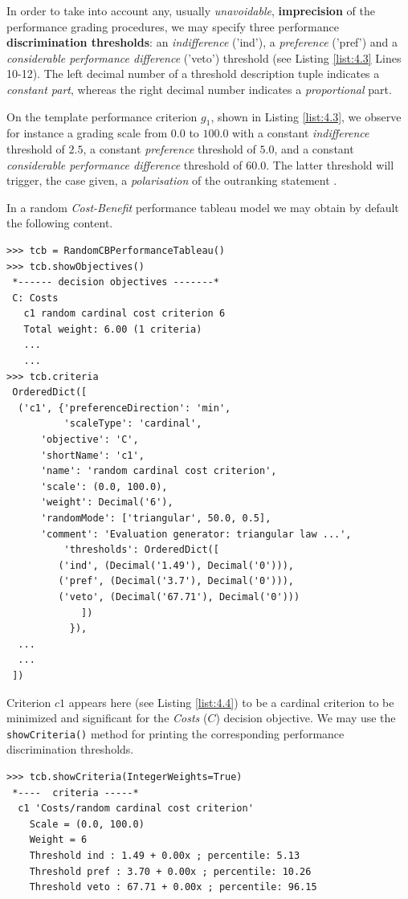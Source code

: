 In order to take into account any, usually \emph{unavoidable}, \textbf{imprecision} of the performance grading procedures, we may specify three performance \textbf{discrimination thresholds}: an \emph{indifference} ('ind'), a \emph{preference} ('pref') and a \emph{considerable performance difference} ('veto') threshold (see Listing \ref{list:4.3} Lines 10-12). The left decimal number of a threshold description tuple indicates a \emph{constant part}, whereas the right decimal number indicates a \emph{proportional} part.

On the template performance criterion $g_1$, shown in Listing \ref{list:4.3}, we observe for instance a grading scale from $0.0$ to $100.0$ with a constant \emph{indifference} threshold of $2.5$, a constant \emph{preference} threshold of $5.0$, and a constant \emph{considerable performance difference} threshold of $60.0$. The latter threshold  will trigger, the case given, a \emph{polarisation} of the outranking statement \citep{BIS-2013}.

In a random \emph{Cost-Benefit} performance tableau model we may obtain by default the following content.

\begin{lstlisting}[caption={Example of cardinal Costs criterion},label=list:4.4,basicstyle=\footnotesize]
>>> tcb = RandomCBPerformanceTableau()
>>> tcb.showObjectives()
 *------ decision objectives -------*
 C: Costs
   c1 random cardinal cost criterion 6
   Total weight: 6.00 (1 criteria)
   ...
   ...
>>> tcb.criteria
 OrderedDict([
  ('c1', {'preferenceDirection': 'min',
          'scaleType': 'cardinal',
	  'objective': 'C',
	  'shortName': 'c1',
	  'name': 'random cardinal cost criterion',
	  'scale': (0.0, 100.0),
	  'weight': Decimal('6'),
	  'randomMode': ['triangular', 50.0, 0.5],
	  'comment': 'Evaluation generator: triangular law ...',
          'thresholds': OrderedDict([
	     ('ind', (Decimal('1.49'), Decimal('0'))),
	     ('pref', (Decimal('3.7'), Decimal('0'))),
	     ('veto', (Decimal('67.71'), Decimal('0')))
             ])
           }),
  ...
  ...
 ])
\end{lstlisting}

Criterion $c1$ appears here (see Listing \ref{list:4.4}) to be a cardinal criterion to be minimized and significant for the \emph{Costs} ($C$) decision objective. We may use the {\tt showCriteria()} method for printing the corresponding performance discrimination thresholds.

\begin{lstlisting}[basicstyle=\footnotesize]
>>> tcb.showCriteria(IntegerWeights=True)
 *----  criteria -----*
  c1 'Costs/random cardinal cost criterion'
    Scale = (0.0, 100.0)
    Weight = 6 
    Threshold ind : 1.49 + 0.00x ; percentile: 5.13
    Threshold pref : 3.70 + 0.00x ; percentile: 10.26
    Threshold veto : 67.71 + 0.00x ; percentile: 96.15
\end{lstlisting}


